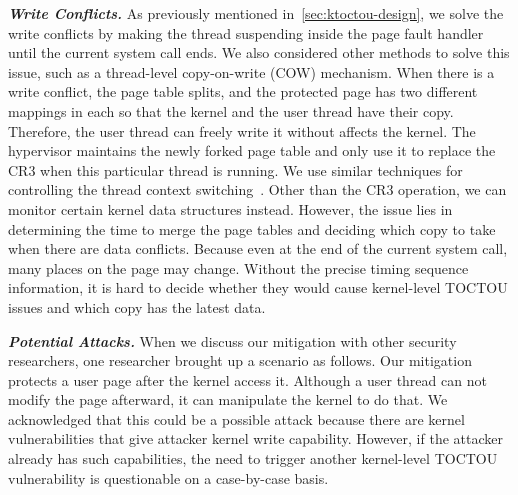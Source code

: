 \textbf{\textit{Write Conflicts.}} As previously mentioned in~\autoref{sec:ktoctou-design}, we solve the write conflicts by making the thread suspending inside the page fault handler until the current system call ends. We also considered other methods to solve this issue, such as a thread-level copy-on-write (COW) mechanism. When there is a write conflict, the page table splits, and the protected page has two different mappings in each so that the kernel and the user thread have their copy. Therefore, the user thread can freely write it without affects the kernel. The hypervisor maintains the newly forked page table and only use it to replace the CR3 when this particular thread is running. We use similar techniques for controlling the thread context switching~\cite{pan2017digtool}. Other than the CR3 operation,  we can monitor certain kernel data structures instead.  However, the issue lies in determining the time to merge the page tables and deciding which copy to take when there are data conflicts. Because even at the end of the current system call, many places on the page may change. Without the precise timing sequence information, it is hard to decide whether they would cause kernel-level TOCTOU issues and which copy has the latest data.



\textbf{\textit{Potential Attacks.}} When we discuss our mitigation with other security researchers, one researcher brought up a scenario as follows. Our mitigation protects a user page after the kernel access it. Although a user thread can not modify the page afterward, it can manipulate the kernel to do that. We acknowledged that this could be a possible attack because there are kernel vulnerabilities that give attacker kernel write capability. However, if the attacker already has such capabilities, the need to trigger another kernel-level TOCTOU vulnerability is questionable on a case-by-case basis.
